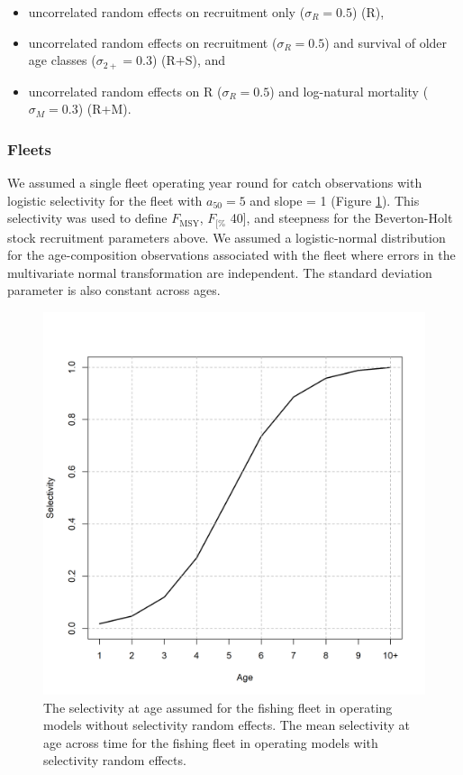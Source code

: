 \documentclass[
  12pt,
]{article}
\newcommand{\Fmsy}{\ensuremath{F_{\text{MSY}}}\xspace}
\newcommand{\Fspr}[1]{\ensuremath{F_{\text{{#1}\%}}}\xspace}
\begin{document}
\begin{itemize}
\item uncorrelated random effects on recruitment only ($\sigma_R = 0.5$) (R),
\item uncorrelated random effects on recruitment ($\sigma_R = 0.5$) and survival of older age classes ($\sigma_{2+} = 0.3$) (R+S), and
\item uncorrelated random effects on R ($\sigma_R = 0.5$) and log-natural mortality ($\sigma_M = 0.3$) (R+M).
\end{itemize}

\hypertarget{fleets}{%
\subsubsection*{Fleets}\label{fleets}}

We assumed a single fleet operating year round for catch observations
with logistic selectivity for the fleet with \(a_{50} = 5\) and slope =
1 (Figure \ref{om_mean_selectivity}). This selectivity was used to
define \Fmsy, \Fspr[40], and steepness for the Beverton-Holt stock
recruitment parameters above. We assumed a logistic-normal distribution
for the age-composition observations associated with the fleet where
errors in the multivariate normal transformation are independent. The
standard deviation parameter is also constant across ages.

\begin{figure}
\caption{The selectivity at age assumed for the fishing fleet in operating models without selectivity random effects. The mean selectivity at age across time for the fishing fleet in operating models with selectivity random effects.}\label{om_mean_selectivity}
\begin{center}
\includegraphics[width = \textwidth]{om_mean_selectivity.png}
\end{center}
\end{figure}
\end{document}

